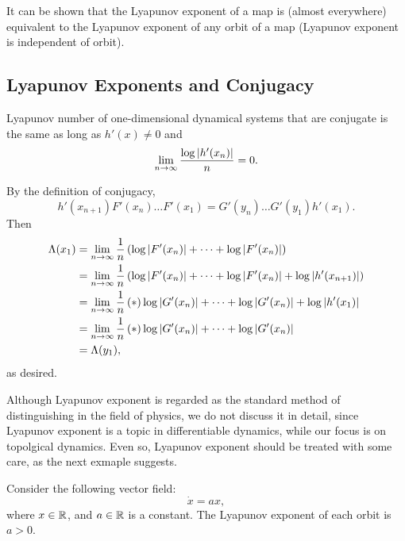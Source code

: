 \documentclass[12pt,twoside]{book}
\begin{document}
It can be shown that the Lyapunov exponent of a map is (almost everywhere) equivalent to the Lyapunov exponent of any orbit of a map (Lyapunov exponent is independent of orbit).

\subsection{Lyapunov Exponents and Conjugacy}
Lyapunov number of one-dimensional dynamical systems that are conjugate is the same
as long as $h'(x) \neq 0$ and
\begin{equation*}
  \lim\limits_{n\to \infty} \frac{\log\left | h'(x_n) \right |}{n} = 0.
\end{equation*}

By the definition of conjugacy,
\begin{equation*}
  h'(x_{n+1})F'(x_n)\ldots F'(x_1) = G'(y_n)\ldots G'(y_1)h'(x_1).
\end{equation*}
Then 
\begin{align*}
  \Lambda(x_1) &= \lim\limits_{n\to \infty} \frac{1}{n}\left ( \log\left | F'(x_n) \right | + \cdots + \log\left | F'(x_n) \right |  \right ) \\
  &= \lim\limits_{n\to \infty} \frac{1}{n}\left(\log\left | F'(x_n) \right | + \cdots + \log\left | F'(x_n) \right | + \log\left | h'(x_{n+1}) \right |\right) \\
  &= \lim\limits_{n\to \infty} \frac{1}{n} \left ( * \right ){ \log\left | G'(x_n) \right | + \cdots + \log\left | G'(x_n) \right | + \log\left | h'(x_1) \right | } \\
  &= \lim\limits_{n\to \infty} \frac{1}{n} \left ( * \right ){ \log\left | G'(x_n) \right | + \cdots + \log\left | G'(x_n) \right | } \\
  &= \Lambda(y_1),
\end{align*} 
as desired.

Although Lyapunov exponent is regarded as the standard method of distinguishing in the field of physics, we do not discuss it in detail, since Lyapunov exponent is a topic in differentiable dynamics, while our focus is on topolgical dynamics.
Even so, Lyapunov exponent should be treated with some care, as the next exmaple suggests.
\begin{example}
  \citep{wiggins}
  Consider the following vector field:
  \begin{equation*}
    \dot{x} = ax,
  \end{equation*}
  where $x \in \mathbb{R}$, and $a \in \mathbb{R}$ is a constant.
  The Lyapunov exponent of each orbit is $a > 0$.
\end{example}



\end{document}
